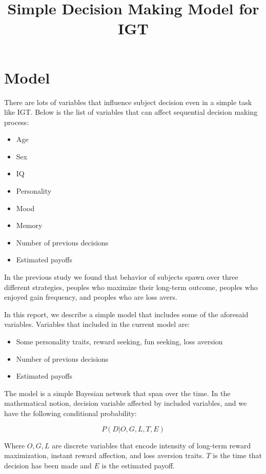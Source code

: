 \documentclass[12pt]{article}
\title{Simple Decision Making Model for IGT}
\author{}
\begin{document}
\maketitle
\section{Model}

There are lots of variables that influence subject decision even in a simple
task like IGT.  Below is the list of variables that can affect sequential
decision making process:

\begin{itemize}
	\item Age
	\item Sex
	\item IQ
	\item Personality
	\item Mood
	\item Memory
	\item Number of previous decisions
	\item Estimated payoffs
\end{itemize}

In the previous study we found that behavior of subjects spawn over three
different strategies, peoples who maximize their long-term outcome, peoples who
enjoyed gain frequency, and peoples who are loss avers.

In this report, we describe a simple model that includes some of the
aforesaid variables. Variables that included in the current model are:

\begin{itemize}
	\item Some personality traits, reward seeking, fun seeking, loss aversion
	\item Number of previous decisions
	\item Estimated payoffs
\end{itemize}

The model is a simple Bayesian network that span over the time. In the
mathematical notion, decision variable affected by included variables, and we
have the following conditional probability:

\[
	P(D | O, G, L, T, E)
\]

Where $ O, G, L $ are discrete variables that encode intensity of long-term
reward maximization, instant reward affection, and loss aversion traits. $ T $  is
the time that decision has been made and $ E $ is the estimated payoff.
\end{document}
